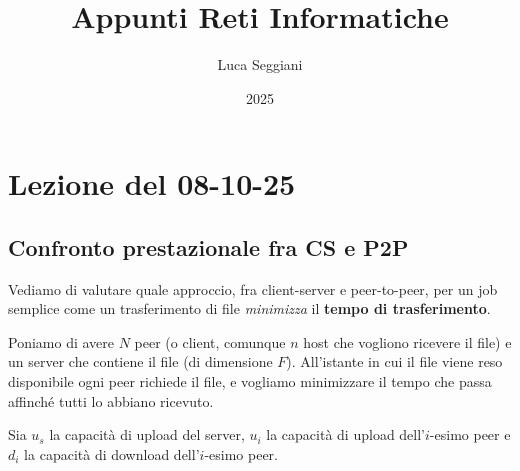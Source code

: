 \documentclass[a4paper,11pt]{article}
\title{Appunti Reti Informatiche}
\author{Luca Seggiani}
\date{2025}
\begin{document}
\section{Lezione del 08-10-25}

\thispagestyle{empty}
\pagestyle{fancy}

\subsection{Confronto prestazionale fra CS e P2P}
Vediamo di valutare quale approccio, fra client-server e peer-to-peer, per un job semplice come un trasferimento di file \textit{minimizza} il \textbf{tempo di trasferimento}.

Poniamo di avere $N$ peer (o client, comunque $n$ host che vogliono ricevere il file) e un server che contiene il file (di dimensione $F$). All'istante in cui il file viene reso disponibile ogni peer richiede il file, e vogliamo minimizzare il tempo che passa affinché tutti lo abbiano ricevuto.

Sia $u_s$ la capacità di upload del server, $u_i$ la capacità di upload dell'$i$-esimo peer e $d_i$ la capacità di download dell'$i$-esimo peer.
\end{document}
